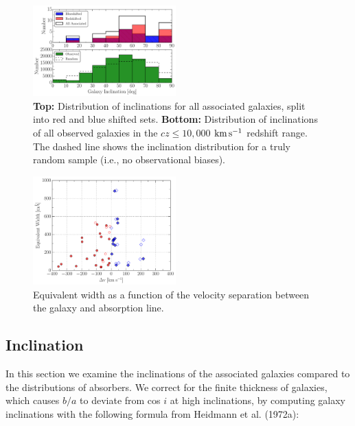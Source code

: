\documentclass[twocolumn,tighten]{aastex6}
\begin{document}
\begin{figure}[h!]
        \centering
        \includegraphics[width=0.49\textwidth]{fig9.pdf}
        \caption{\small{\textbf{Top: }Distribution of inclinations for all associated galaxies, split into red and blue shifted sets. \textbf{Bottom:} Distribution of inclinations of all observed galaxies in the $cz \leq 10,000$ $\rm km\, s^{-1}$ redshift range. The dashed line shows the inclination distribution for a truly random sample (i.e., no observational biases).}}
        \label{hist_inc}
        \vspace{2pt}
\end{figure}


\begin{figure}[ht!]
        \centering
        \includegraphics[width=0.49\textwidth]{fig10.pdf}
        \caption{\small{Equivalent width as a function of the velocity separation between the galaxy and absorption line. }}
        \label{W_veldif}
        \vspace{5pt}
\end{figure} 


\subsection{Inclination}
\label{inclination}

In this section we examine the inclinations of the associated galaxies compared to the distributions of absorbers. We correct for the finite thickness of galaxies, which causes $b/a$ to deviate from cos $i$ at high inclinations, by computing galaxy inclinations with the following formula from Heidmann et al. (1972a):
\end{document}
